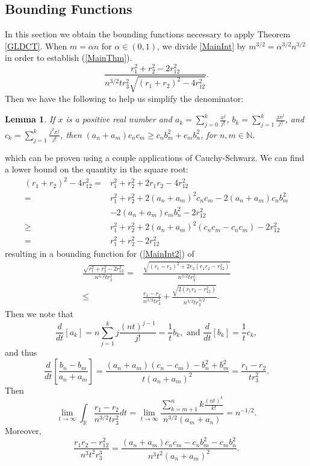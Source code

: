 \documentclass[12pt]{amsart}
\newtheorem{lemma}[theorem]{Lemma}
\theoremstyle{remark}
\begin{document}
\subsection{Bounding Functions}
In this section we obtain the bounding functions necessary to apply Theorem \ref{GLDCT}.  When $m=\alpha n$ for $\alpha\in(0,1)$, we divide \ref{MainInt} by $m^{3/2}=\alpha^{3/2}n^{3/2}$ in order to establish (\ref{MainThm}).
\begin{equation}\label{MainInt2}\frac{r_1^2+r_2^2-2r_{12}^2}{n^{3/2}tr_3^2\sqrt{(r_1+r_2)^2-4r_{12}^2}}.
\end{equation}
Then we have the following to help us simplify the denominator:
\begin{lemma}\label{CSApplication}
If $x$ is a positive real number and $a_k=\sum_{j=0}^k\frac{x^j}{j!}$, $b_k=\sum_{j=1}^k\frac{jx^j}{j!}$, and $c_k=\sum_{j=1}^k\frac{j^2x^j}{j!}$, then $(a_n+a_m)c_nc_m\ge c_nb_m^2+c_mb_n^2$, for $n,m\in\mathbb{N}$.
\end{lemma}
\noindent which can be proven using a couple applications of Cauchy-Schwarz.  We can find a lower bound on the quantity in the square root:
\begin{align*}
(r_1+r_2)^2-4r_{12}^2=&r_1^2+r_2^2+2r_1r_2-4r_{12}^2
\\=&r_1^2+r_2^2+2(a_n+a_m)^2c_nc_m-2(a_n+a_m)c_nb_m^2
\\&-2(a_n+a_m)c_mb_n^2-2r_{12}^2
\\\ge& r_1^2+r_2^2+2(a_n+a_m)^2(c_nc_m-c_nc_m)-2r_{12}^2
\\=&r_1^2+r_2^2-2r_{12}^2
\end{align*}
resulting in a bounding function for (\ref{MainInt2}) of
\begin{align*}\frac{\sqrt{r_1^2+r_2^2-2r_{12}^2}}{n^{3/2}tr_3^2}=&\frac{\sqrt{(r_1-r_2)^2+2r_3(r_1r_2-r_{12}^2)}}{n^{3/2}tr_3^2}
\\\le&\frac{r_1-r_2}{n^{3/2}tr_3^2}+\frac{\sqrt{2(r_1r_2-r_{12}^2)}}{n^{3/2}tr_3^{3/2}}.
\end{align*}
Then we note that
\[\frac{d}{dt}\left[a_k\right]=n\sum_{j=1}^kj\frac{(nt)^{j-1}}{j!}=\frac{1}{t}b_k,\text{ and }\frac{d}{dt}\left[b_k\right]=\frac{1}{t}c_k,\] and thus
\[\frac{d}{dt}\left[\frac{b_n-b_m}{a_n+a_m}\right]=\frac{(a_n+a_m)(c_n-c_m)-b_n^2+b_m^2}{t(a_n+a_m)^2}=\frac{r_1-r_2}{tr_3^2}.\]
Then
\[\lim_{t\to\infty}\int_\mathbb{R}\frac{r_1-r_2}{n^{3/2}tr_3^2}dt=\lim_{t\rightarrow\infty}\frac{\sum_{k=m+1}^nk\frac{(nt)^k}{k!}}{n^{3/2}(a_m+a_n)}=n^{-1/2}.\]
Moreover,
\[\frac{r_1r_2-r_{12}^2}{n^3t^2r_3^3}=\frac{(a_n+a_m)c_nc_m-c_nb_m^2-c_mb_n^2}{n^3t^2(a_n+a_m)^2}.\]
\end{document}
